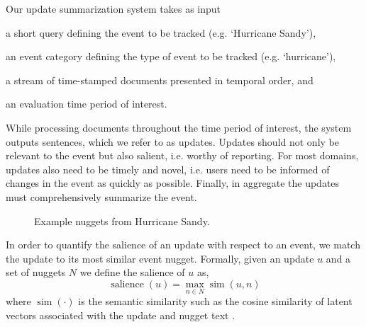 
Our update summarization system takes as input 
\begin{enumerate*}[label=\itshape\alph*\upshape)]
  \item a short query defining the event to be tracked (e.g. `Hurricane Sandy'), 
  \item an event category defining the type of event to be tracked (e.g. `hurricane'), 
  \item a stream of time-stamped documents %
  presented in temporal order, and \item an evaluation time period of interest.
      \end{enumerate*} While processing documents
      throughout the time period of interest, the system outputs sentences,
      which we refer to as updates.
      Updates should not only be relevant to the event but also salient,
      i.e. worthy of
      reporting.
      For most domains, updates also need to be 
      timely and novel, i.e. users need to be informed of changes in the 
      event as quickly as possible.
      Finally, in aggregate the updates must comprehensively summarize the 
      event.

\begin{figure}
\setlength{\fboxsep}{10pt}
 \caption{Example nuggets from Hurricane Sandy.\label{fig:nuggets}}
\end{figure}



In order to quantify the salience of an update with respect to an event,
we match the update to its most similar event nugget.
Formally, given an update $u$ and a set of nuggets $N$ we define the salience of 
$u$ as,
\[\operatorname{salience}(u) = \operatorname{max}_{n \in N} 
\operatorname{sim}(u, n) \]
where $\operatorname{sim}(\cdot)$ is the semantic similarity such as
the cosine similarity of latent vectors associated with the update and 
nugget text \cite{?}. %




